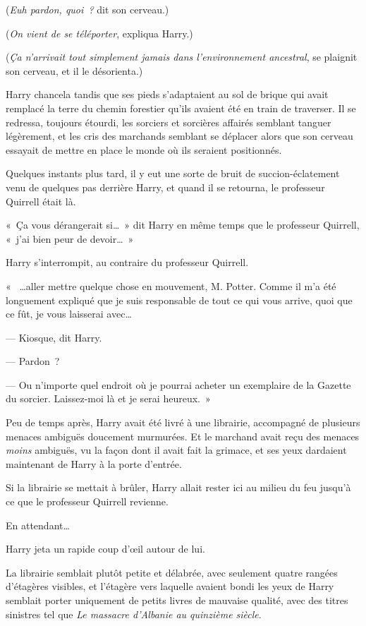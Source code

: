 (\emph{Euh pardon, quoi~?} dit son cerveau.)

(\emph{On vient de se téléporter}, expliqua Harry.)

(\emph{Ça n'arrivait tout simplement jamais dans l'environnement ancestral}, se plaignit son cerveau, et il le désorienta.)

Harry chancela tandis que ses pieds s'adaptaient au sol de brique qui avait remplacé la terre du chemin forestier qu'ils avaient été en train de traverser.
Il se redressa, toujours étourdi, les sorciers et sorcières affairés semblant tanguer légèrement, et les cris des marchands semblant se déplacer alors que son cerveau essayait de mettre en place le monde où ils seraient positionnés.

Quelques instants plus tard, il y eut une sorte de bruit de succion-éclatement venu de quelques pas derrière Harry, et quand il se retourna, le professeur Quirrell était là.

«~Ça vous dérangerait si…~»
dit Harry en même temps que le professeur Quirrell, «~j'ai bien peur de devoir…~»

Harry s'interrompit, au contraire du professeur Quirrell.

«~ …aller mettre quelque chose en mouvement, M. Potter.
Comme il m'a été longuement expliqué que je suis responsable de tout ce qui vous arrive, quoi que ce fût, je vous laisserai avec…

--- Kiosque, dit Harry.

--- Pardon~?

--- Ou n'importe quel endroit où je pourrai acheter un exemplaire de la Gazette du sorcier.
Laissez-moi là et je serai heureux.~»

Peu de temps après, Harry avait été livré à une librairie, accompagné de plusieurs menaces ambiguës doucement murmurées.
Et le marchand avait reçu des menaces \emph{moins} ambiguës, vu la façon dont il avait fait la grimace, et ses yeux dardaient maintenant de Harry à la porte d'entrée.

Si la librairie se mettait à brûler, Harry allait rester ici au milieu du feu jusqu'à ce que le professeur Quirrell revienne.

En attendant…

Harry jeta un rapide coup d'œil autour de lui.

La librairie semblait plutôt petite et délabrée, avec seulement quatre rangées d'étagères visibles, et l'étagère vers laquelle avaient bondi les yeux de Harry semblait porter uniquement de petits livres de mauvaise qualité, avec des titres sinistres tel que \emph{Le massacre d'Albanie au quinzième siècle}.

